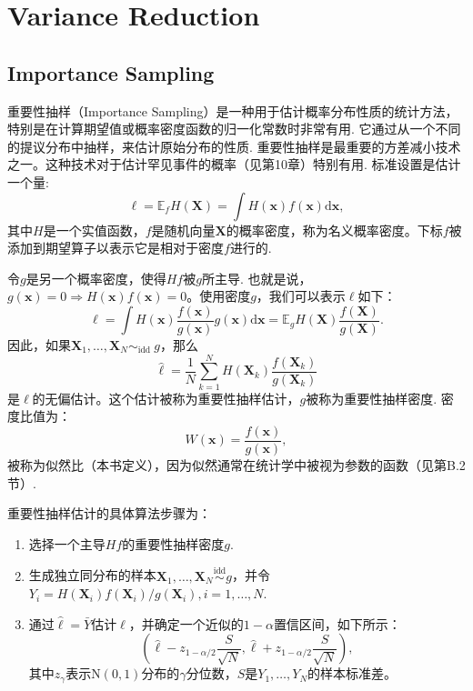 \chapter{Variance Reduction}

\section{Importance Sampling}
重要性抽样（Importance Sampling）是一种用于估计概率分布性质的统计方法，特别是在计算期望值或概率密度函数的归一化常数时非常有用. 它通过从一个不同的提议分布中抽样，来估计原始分布的性质. 重要性抽样是最重要的方差减小技术之一。这种技术对于估计罕见事件的概率（见第10章）特别有用. 标准设置是估计一个量:
\begin{equation}
	\ell=\mathbb{E}_f H(\mathbf{X})=\int H(\mathbf{x}) f(\mathbf{x}) \mathrm{d} \mathbf{x},
\end{equation}
其中$H$是一个实值函数，$f$是随机向量$\mathbf{X}$的概率密度，称为名义概率密度。下标$f$被添加到期望算子以表示它是相对于密度$f$进行的.

令$g$是另一个概率密度，使得$H f$被$g$所主导. 也就是说，$g(\mathbf{x})=0 \Rightarrow H(\mathbf{x}) f(\mathbf{x})=0$。使用密度$g$，我们可以表示$\ell$如下：
\begin{equation}
	\ell=\int H(\mathbf{x}) \frac{f(\mathbf{x})}{g(\mathbf{x})} g(\mathbf{x}) \mathrm{d} \mathbf{x}=\mathbb{E}_g H(\mathbf{X}) \frac{f(\mathbf{X})}{g(\mathbf{X})}.
\end{equation}
因此，如果$\mathbf{X}_1, \ldots, \mathbf{X}_N \sim_{\text {idd }} g$，那么
\begin{equation}
	\widehat{\ell}=\frac{1}{N} \sum_{k=1}^N H\left(\mathbf{X}_k\right) \frac{f\left(\mathbf{X}_k\right)}{g\left(\mathbf{X}_k\right)}
\end{equation}
是$\ell$的无偏估计。这个估计被称为重要性抽样估计，$g$被称为重要性抽样密度. 密度比值为：
\begin{equation}
	W(\mathbf{x})=\frac{f(\mathbf{x})}{g(\mathbf{x})},
\end{equation}
被称为似然比（本书定义），因为似然通常在统计学中被视为参数的函数（见第B.2节）.


\begin{Algorithm}[重要性抽样估计]重要性抽样估计的具体算法步骤为：
	\begin{enumerate}
		\item 选择一个主导$Hf$的重要性抽样密度$g$.
		\item  生成独立同分布的样本$\mathbf{X}_1, \ldots, \mathbf{X}_N \stackrel{\text{idd}}{\sim} g$，并令$Y_i=H\left(\mathbf{X}_i\right) f\left(\mathbf{X}_i\right) / g\left(\mathbf{X}_i\right), i=1, \ldots, N$.
		\item 通过$\widehat{\ell}=\bar{Y}$估计$\ell$，并确定一个近似的$1-\alpha$置信区间，如下所示：
		$$
		\left(\widehat{\ell}-z_{1-\alpha / 2} \frac{S}{\sqrt{N}}, \widehat{\ell}+z_{1-\alpha / 2} \frac{S}{\sqrt{N}}\right),
		$$
		其中$z_\gamma$表示$\mathrm{N}(0,1)$分布的$\gamma$分位数，$S$是$Y_1, \ldots, Y_N$的样本标准差。
	\end{enumerate}
	
	
\end{Algorithm}


